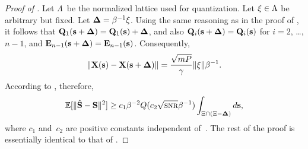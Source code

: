 \begin{subappendices}
  \begin{proof}[Proof of ]
    Let $\Lambda$~be the normalized lattice used for quantization. Let $\mathbf{\xi} \in
    \Lambda$ be arbitrary but fixed. Let $\mathbf{\Delta} = \beta^{-1} \mathbf{\xi}$. Using the same
    reasoning as in the proof of , it follows that $\mathbf{Q}_1(\mathbf{s}
    + \mathbf{\Delta}) = \mathbf{Q}_1(\mathbf{s}) + \mathbf{\Delta}$, and also $\mathbf{Q}_i(\mathbf{s} + \mathbf{\Delta}) = \mathbf{Q}_i(\mathbf{s})$ for $i = 2$,
    \ldots, $n-1$, and $\mathbf{E}_{n-1}(\mathbf{s}+\mathbf{\Delta}) = \mathbf{E}_{n-1}(\mathbf{s})$. Consequently,
    \begin{equation*}
      \| \mathbf{X}(\mathbf{s}) - \mathbf{X}(\mathbf{s} +\mathbf{\Delta}) \| = \frac{\sqrt{mP}}{\gamma}\|\mathbf{\xi}\| \beta^{-1}.
    \end{equation*}
    According to , therefore,
    \begin{equation*}
      \msev \ge c_1 \beta^{-2} Q(c_2 \sqrt{\snr} \beta^{-1}) \int_{\Xi \cap (\Xi
      - \Dv)} d\s,
    \end{equation*}
    where $c_1$ and~$c_2$ are positive constants independent of~\snr.  The rest
    of the proof is essentially identical to that of
    . 
  \end{proof}

\end{subappendices}
